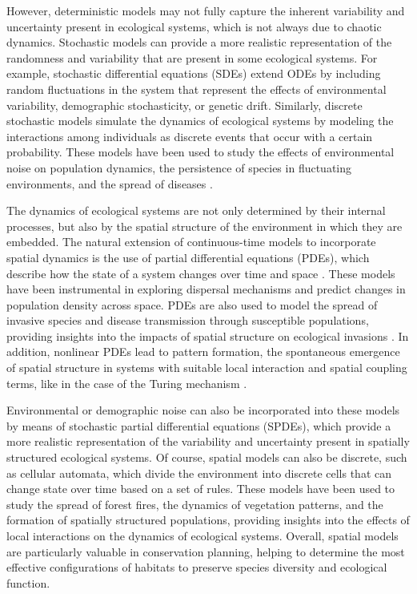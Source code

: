 However, deterministic models may not fully capture the inherent variability
and uncertainty present in ecological systems, which is not always due to
chaotic dynamics. Stochastic models can provide a more realistic representation
of the randomness and variability that are present in some ecological systems.
For example, stochastic differential equations (SDEs) extend ODEs by including
random fluctuations in the system that represent the effects of environmental
variability, demographic stochasticity, or genetic drift. Similarly, discrete
stochastic models simulate the dynamics of ecological systems by modeling the
interactions among individuals as discrete events that occur with a certain
probability. These models have been used to study the effects of environmental
noise on population dynamics, the persistence of species in fluctuating
environments, and the spread of diseases \cite{Murray_book}.

The dynamics of ecological systems are not only determined by their internal
processes, but also by the spatial structure of the environment in which they
are embedded. The natural extension of continuous-time models to
incorporate spatial dynamics is the use of partial differential equations
(PDEs), which describe how the state of a system changes over time and
space \cite{Murray_book}. These models have been instrumental in exploring
dispersal mechanisms and predict changes in population density across space.
PDEs are also used to model the spread of invasive species and disease
transmission through susceptible populations, providing insights into the
impacts of spatial structure on ecological invasions \cite{tilman1997spatial}.
In addition, nonlinear PDEs lead to pattern formation, the spontaneous
emergence of spatial structure in systems with suitable local interaction and
spatial coupling terms, like in the case of the Turing mechanism
\cite{turing1952chemical}.

Environmental or demographic noise can also be incorporated into these models
by means of stochastic partial differential equations (SPDEs), which provide a
more realistic representation of the variability and uncertainty present in
spatially structured ecological systems. Of course, spatial models can also
be discrete, such as cellular automata, which divide the environment into
discrete cells that can change state over time based on a set of rules. These
models have been used to study the spread of forest fires, the dynamics of
vegetation patterns, and the formation of spatially structured populations,
providing insights into the effects of local interactions on the dynamics of
ecological systems. Overall, spatial models are particularly valuable in
conservation planning, helping to determine the most effective configurations
of habitats to preserve species diversity and ecological function.

